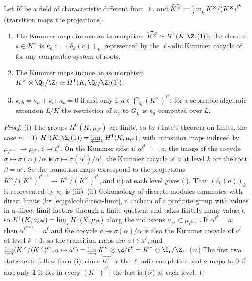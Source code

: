 \begin{theorem}\label{thm:galcoh:kummer-ladic}
Let $K$ be a field of characteristic different from $\ell$, and $\widehat{K^\times}:=\varprojlim_kK^\times/(K^\times)^{\ell^k}$ (transition maps the projections).
\begin{enumerate}[label=(\roman*)]
\item The Kummer maps induce an isomorphism $\widehat{K^\times}\simeq H^1(K,\Z_\ell(1))$; the class of $a\in K^\times$ is $\kappa_a:=(\delta_k(a))_k$, represented by the
$\ell$-adic Kummer cocycle of  for any compatible system of roots.
\item The Kummer maps induce an isomorphism $K^\times\otimes\Q_\ell/\Z_\ell\simeq H^1(K,\Q_\ell/\Z_\ell(1))$.
\item $\kappa_{ab}=\kappa_a+\kappa_b$; $\kappa_a=0$ if and only if $a\in\bigcap_k(K^\times)^{\ell^k}$; for a separable algebraic extension $L/K$ the restriction of $\kappa_a$ to
$G_L$ is $\kappa_a$ computed over $L$.
\end{enumerate}
\end{theorem}

\begin{proof}
(i) The groups $H^0(K,\mu_{\ell^k})$ are finite, so by  (Tate's theorem on limits, the case $n=1$)
$H^1(K,\Z_\ell(1))=\varprojlim_kH^1(K,\mu_{\ell^k})$, with transition maps induced by $\mu_{\ell^{k+1}}\to\mu_{\ell^k}$, $\zeta\mapsto\zeta^\ell$. On the Kummer side: if
$\alpha^{\ell^{k+1}}=a$, the image of the cocycle $\sigma\mapsto\sigma(\alpha)/\alpha$ is $\sigma\mapsto\sigma(\alpha^\ell)/\alpha^\ell$, the Kummer cocycle of $a$ at level $k$ for the root
$\beta=\alpha^\ell$. So the transition maps correspond to the projections $K^\times/(K^\times)^{\ell^{k+1}}\to K^\times/(K^\times)^{\ell^k}$, and (i) at
each level gives (i). That $(\delta_k(a))_k$ is represented by $\kappa_a$ is (iii).
(ii) Cohomology of discrete modules commutes with direct limits (by \eqref{eq:galcoh:direct-limit}, a cochain of a profinite group with values in a direct limit
factors through a finite quotient and takes finitely many values), so $H^1(K,\mu_{\ell^\infty})=\varinjlim_kH^1(K,\mu_{\ell^k})$ along the inclusions
$\mu_{\ell^k}\subset\mu_{\ell^{k+1}}$. If $\alpha^{\ell^k}=a$, then $\alpha^{\ell^{k+1}}=a^\ell$ and the cocycle $\sigma\mapsto\sigma(\alpha)/\alpha$ is also the Kummer cocycle of $a^\ell$
at level $k+1$; so the transition maps are $a\mapsto a^\ell$, and $\varinjlim(K^\times/(K^\times)^{\ell^k},a\mapsto a^\ell)=\varinjlim K^\times\otimes\Z/\ell^k=K^\times\otimes\Q_\ell/\Z_\ell$.
(iii) The first two statements follow from (i), since $\widehat{K^\times}$ is the $\ell$-adic completion and $a$ maps to $0$ if and only if it lies in every $(K^\times)^{\ell^k}$; the last
is (iv) at each level.
\end{proof}

